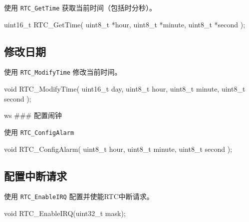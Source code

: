 \documentclass[
  12pt,
]{book}
\newenvironment{Shaded}{\begin{snugshade}}{\end{snugshade}}
\newcommand{\DataTypeTok}[1]{\textcolor[rgb]{0.13,0.29,0.53}{#1}}
\newcommand{\NormalTok}[1]{#1}
\begin{document}
使用 \texttt{RTC\_GetTime} 获取当前时间（包括时分秒）。

\begin{Shaded}
\begin{Highlighting}[]
\DataTypeTok{uint16_t}\NormalTok{ RTC_GetTime(}
  \DataTypeTok{uint8_t}\NormalTok{ *hour, }
  \DataTypeTok{uint8_t}\NormalTok{ *minute, }
  \DataTypeTok{uint8_t}\NormalTok{ *second}
\NormalTok{  );}
\end{Highlighting}
\end{Shaded}

\hypertarget{ux4feeux6539ux65e5ux671f}{%
\subsection{修改日期}\label{ux4feeux6539ux65e5ux671f}}

使用 \texttt{RTC\_ModifyTime} 修改当前时间。

\begin{Shaded}
\begin{Highlighting}[]
\DataTypeTok{void}\NormalTok{ RTC_ModifyTime(}
  \DataTypeTok{uint16_t}\NormalTok{ day, }
  \DataTypeTok{uint8_t}\NormalTok{ hour, }
  \DataTypeTok{uint8_t}\NormalTok{ minute, }
  \DataTypeTok{uint8_t}\NormalTok{ second}
\NormalTok{  );}
\end{Highlighting}
\end{Shaded}

ws
\#\#\# 配置闹钟

使用 \texttt{RTC\_ConfigAlarm}

\begin{Shaded}
\begin{Highlighting}[]
\DataTypeTok{void}\NormalTok{ RTC_ConfigAlarm(}
  \DataTypeTok{uint8_t}\NormalTok{ hour, }
  \DataTypeTok{uint8_t}\NormalTok{ minute, }
  \DataTypeTok{uint8_t}\NormalTok{ second}
\NormalTok{  );}
\end{Highlighting}
\end{Shaded}

\hypertarget{ux914dux7f6eux4e2dux65adux8bf7ux6c42-1}{%
\subsection{配置中断请求}\label{ux914dux7f6eux4e2dux65adux8bf7ux6c42-1}}

使用 \texttt{RTC\_EnableIRQ} 配置并使能RTC中断请求。

\begin{Shaded}
\begin{Highlighting}[]
\DataTypeTok{void}\NormalTok{ RTC_EnableIRQ(}\DataTypeTok{uint32_t}\NormalTok{ mask);}
\end{Highlighting}
\end{Shaded}
\end{document}
